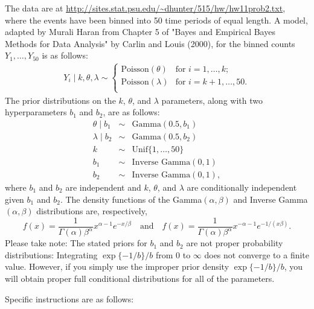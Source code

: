 \documentclass{article}
\begin{document}
\begin{enumerate}
  The data are at 
  \url{http://sites.stat.psu.edu/~dhunter/515/hw/hw11prob2.txt},
  where the events have been binned into 50 time periods of equal length. A
  model, adapted by Murali Haran from Chapter 5 of "Bayes and Empirical Bayes
  Methods for Data Analysis" by Carlin and Louis (2000), for the binned counts
  $Y_1, \ldots, Y_{50}$ is as follows:
  \begin{eqnarray*}
  Y_i \mid k, \theta, \lambda \sim \begin{cases}
  \mbox{Poisson}(\theta) & \mbox{for $i=1, \ldots, k$;} \\
  \mbox{Poisson}(\lambda) & \mbox{for $i=k+1, \ldots, 50$.} \\
  \end{cases}
  \end{eqnarray*}
  The prior distributions on the $k$, $\theta$, and $\lambda$ parameters, along
  with two hyperparameters $b_1$ and $b_2$, are as follows:
  \begin{eqnarray*}
  \theta\mid b_1 &\sim& \mbox{Gamma}(0.5, b_1) \\
  \lambda\mid b_2 &\sim& \mbox{Gamma}(0.5, b_2) \\
  k &\sim& \mbox{Unif}\{1, \ldots, 50\} \\
  b_1 &\sim& \mbox{Inverse Gamma}(0,1) \\
  b_2 &\sim& \mbox{Inverse Gamma}(0,1),
  \end{eqnarray*}
  where $b_1$ and $b_2$ are independent and $k$, $\theta$, and $\lambda$ are
  conditionally independent given $b_1$ and $b_2$. The density functions of the
  Gamma$(\alpha, \beta)$ and Inverse Gamma$(\alpha, \beta)$ distributions are,
  respectively,
  \[
  f(x) = \frac{1}{\Gamma(\alpha)\beta^\alpha} x^{\alpha-1} e^{-x/\beta}
  \quad\mbox{and}\quad
  f(x) = \frac{1}{\Gamma(\alpha)\beta^\alpha} x^{-\alpha-1} e^{-1/(x\beta)}.
  \]
  Please take note:  The stated priors for $b_1$ and $b_2$ are not proper probability
  distributions:  Integrating $\exp\{-1/b\}/b$ from 0 to $\infty$ does not converge to a finite
  value.  However, if you simply use the improper prior density $\exp\{-1/b\}/b$, you will obtain
  proper full conditional distributions for all of the parameters.
  
  Specific instructions are as follows:

    \begin{enumerate}
    

\end{enumerate}
\end{enumerate}
\end{document}
